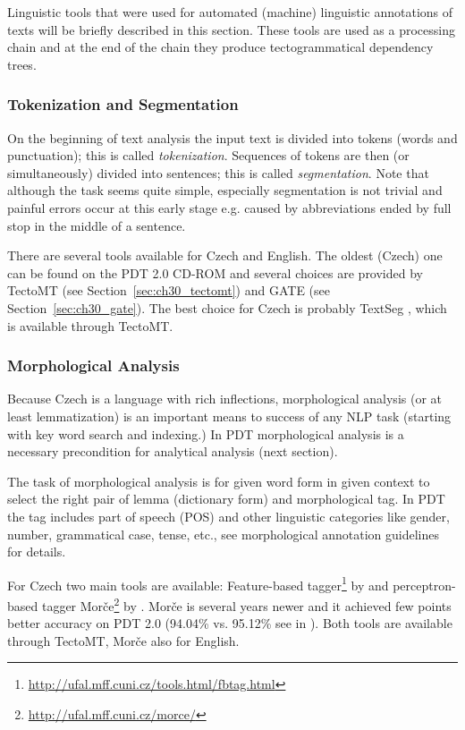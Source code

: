 Linguistic tools that were used for automated (machine) linguistic annotations of texts will be briefly described in this section. These tools are used as a processing chain and at the end of the chain they produce tectogrammatical dependency trees. 


 
\subsubsection{Tokenization and Segmentation} 
On the beginning of text analysis the input text is divided into tokens (words and punctuation); this is called \emph{tokenization}. Sequences of tokens are then (or simultaneously) divided into sentences; this is called \emph{segmentation}. Note that although the task seems quite simple, especially segmentation is not trivial and painful errors occur at this early stage e.g. caused by abbreviations ended by full stop in the middle of a sentence.

There are several tools available for Czech and English. The oldest (Czech) one can be found on the PDT 2.0 CD-ROM \cite{biblio:PDT20_CD} and several choices are provided by TectoMT (see Section~\ref{sec:ch30_tectomt}) and GATE (see Section~\ref{sec:ch30_gate}). The best choice for Czech is probably TextSeg \citep{TextSeg}, which is available through TectoMT.


		
\subsubsection{Morphological Analysis}

Because Czech is a language with rich inflections, morphological analysis (or at least lemmatization) is an important means to success of any NLP task (starting with key word search and indexing.) In PDT morphological analysis is a necessary precondition for analytical analysis (next section).

The task of morphological analysis is for given word form in given context to select the right pair of lemma (dictionary form) and morphological tag. In PDT the tag includes part of speech (POS) and other linguistic categories like gender, number, grammatical case, tense, etc., see morphological annotation guidelines for details.

For Czech two main tools are available: Feature-based tagger\footnote{\url{http://ufal.mff.cuni.cz/tools.html/fbtag.html}} by \cite{biblio:HajicMorfTag} and perceptron-based tagger Morče\footnote{\url{http://ufal.mff.cuni.cz/morce/}} by \cite{biblio:VoMorphologicalTagging2006}. Morče is several years newer and it achieved few points better accuracy on PDT 2.0 (94.04\% vs. 95.12\% see in \citep{Spoustova07b}). Both tools are available through TectoMT, Morče also for English.

